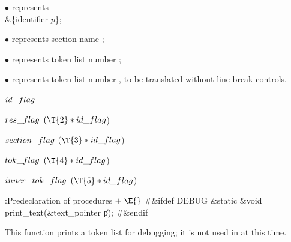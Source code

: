 \item{$\bullet$} represents \.{\\\&\{{\rm identifier
$p$}\}};

\item{$\bullet$} represents section name ;

\item{$\bullet$} represents token list number ;

\item{$\bullet$} represents token list number %
, to be
translated without line-break controls.

\Y\B\4\D$\\{id\_flag}$ \5
\par
\B\4\D$\\{res\_flag}$ \5
$(\T{2}*\\{id\_flag}{}$)\par
\B\4\D$\\{section\_flag}$ \5
$(\T{3}*\\{id\_flag}{}$)\par
\B\4\D$\\{tok\_flag}$ \5
$(\T{4}*\\{id\_flag}{}$)\par
\B\4\D$\\{inner\_tok\_flag}$ \5
$(\T{5}*\\{id\_flag}{}$)\par
\Y\B\4:Predeclaration of procedures\X${}\mathrel+\E{}$\6
\8\#\&{ifdef} \.{DEBUG}\6
\&{static} \&{void} \\{print\_text}(\&{text\_pointer} \|p);\6
\8\#\&{endif}\par
\fi

This function prints a token list for debugging;
it is not used in  at this time.

